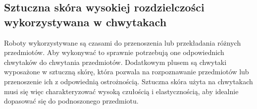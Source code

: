 




\subsection{Sztuczna skóra wysokiej rozdzielczości wykorzystywana w chwytakach}


Roboty wykorzystywane są czasami do przenoszenia lub przekładania różnych przedmiotów. Aby wykonywać to sprawnie potrzebują one odpowiednich chwytaków do chwytania przedmiotów. Dodatkowym plusem są chwytaki wyposażone w sztuczną skórę, która pozwala na rozpoznawanie przedmiotów lub przenoszenie ich z odpowiednią ostrożnością. Sztuczna skóra użyta na chwytakach musi się więc charakteryzować wysoką czułością i elastycznością, aby idealnie dopasować się do podnoszonego przedmiotu.

